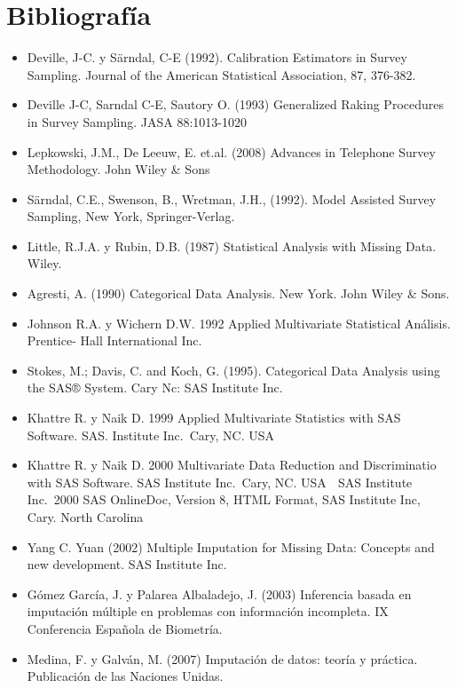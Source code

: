 \documentclass[
  openany]{book}
\begin{document}
\hypertarget{bibliografuxeda}{%
\chapter{\texorpdfstring{\textbf{Bibliografía}}{Bibliografía}}\label{bibliografuxeda}}

\begin{itemize}
\item
  Deville, J-C. y Särndal, C-E (1992). Calibration Estimators in
  Survey Sampling. Journal of the American Statistical Association,
  87, 376-382.
\item
  Deville J-C, Sarndal C-E, Sautory O. (1993) Generalized Raking
  Procedures in Survey Sampling. JASA 88:1013-1020
\item
  Lepkowski, J.M., De Leeuw, E. et.al. (2008) Advances in Telephone
  Survey Methodology. John Wiley \& Sons
\item
  Särndal, C.E., Swenson, B., Wretman, J.H., (1992). Model Assisted
  Survey Sampling, New York, Springer-Verlag.
\item
  Little, R.J.A. y Rubin, D.B. (1987) Statistical Analysis with
  Missing Data. Wiley.
\item
  Agresti, A. (1990) Categorical Data Analysis. New York. John Wiley \&
  Sons.
\item
  Johnson R.A. y Wichern D.W. 1992 Applied Multivariate Statistical
  Análisis. Prentice- Hall International Inc.
\item
  Stokes, M.; Davis, C. and Koch, G. (1995). Categorical Data Analysis
  using the SAS® System. Cary Nc: SAS Institute Inc.
\item
  Khattre R. y Naik D. 1999 Applied Multivariate Statistics with SAS
  Software. SAS. Institute Inc.~Cary, NC. USA
\item
  Khattre R. y Naik D. 2000 Multivariate Data Reduction and
  Discriminatio with SAS Software. SAS Institute Inc.~Cary, NC. USA 
  SAS Institute Inc.~2000 SAS OnlineDoc, Version 8, HTML Format, SAS
  Institute Inc, Cary. North Carolina
\item
  Yang C. Yuan (2002) Multiple Imputation for Missing Data: Concepts
  and new development. SAS Institute Inc.
\item
  Gómez García, J. y Palarea Albaladejo, J. (2003) Inferencia basada
  en imputación múltiple en problemas con información incompleta. IX
  Conferencia Española de Biometría.
\item
  Medina, F. y Galván, M. (2007) Imputación de datos: teoría y
  práctica. Publicación de las Naciones Unidas.

\end{itemize}
\end{document}
